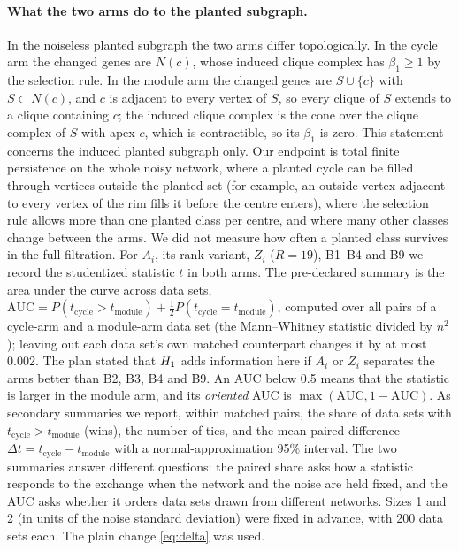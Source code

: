 \paragraph{What the two arms do to the planted subgraph.} In the noiseless planted subgraph the two arms differ topologically. In the cycle arm the changed genes are $N(c)$, whose induced clique complex has $\beta_1\ge1$ by the selection rule. In the module arm the changed genes are $S\cup\{c\}$ with $S\subset N(c)$, and $c$ is adjacent to every vertex of $S$, so every clique of $S$ extends to a clique containing $c$; the induced clique complex is the cone over the clique complex of $S$ with apex $c$, which is contractible, so its $\beta_1$ is zero. This statement concerns the induced planted subgraph only. Our endpoint is total finite persistence on the whole noisy network, where a planted cycle can be filled through vertices outside the planted set (for example, an outside vertex adjacent to every vertex of the rim fills it before the centre enters), where the selection rule allows more than one planted class per centre, and where many other classes change between the arms. We did not measure how often a planted class survives in the full filtration. For $A_i$, its rank variant, $Z_i$ ($R=19$), B1--B4 and B9 we record the studentized statistic $t$ in both arms. The pre-declared summary is the area under the curve across data sets, $\mathrm{AUC}=P(t_{\mathrm{cycle}}>t_{\mathrm{module}})+\tfrac12P(t_{\mathrm{cycle}}=t_{\mathrm{module}})$, computed over all pairs of a cycle-arm and a module-arm data set (the Mann--Whitney statistic divided by $n^2$); leaving out each data set's own matched counterpart changes it by at most 0.002. The plan stated that $H_{1}$ adds information here if $A_i$ or $Z_i$ separates the arms better than B2, B3, B4 and B9. An AUC below 0.5 means that the statistic is larger in the module arm, and its \emph{oriented} AUC is $\max(\mathrm{AUC},1-\mathrm{AUC})$. As secondary summaries we report, within matched pairs, the share of data sets with $t_{\mathrm{cycle}}>t_{\mathrm{module}}$ (wins), the number of ties, and the mean paired difference $\Delta t=t_{\mathrm{cycle}}-t_{\mathrm{module}}$ with a normal-approximation 95\% interval. The two summaries answer different questions: the paired share asks how a statistic responds to the exchange when the network and the noise are held fixed, and the AUC asks whether it orders data sets drawn from different networks. Sizes 1 and 2 (in units of the noise standard deviation) were fixed in advance, with 200 data sets each. The plain change \eqref{eq:delta} was used.

